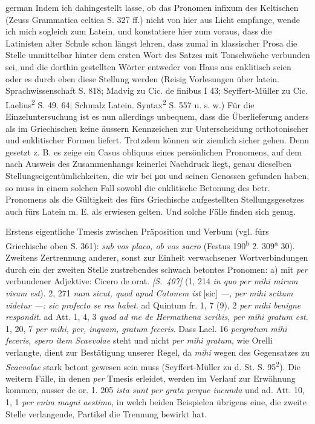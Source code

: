 \begin{otherlanguage*}{german}
Indem ich dahingestellt lasse, ob das Pronomen infixum des Keltischen (Zeuss Grammatica celtica S. 327 ff.) nicht von hier aus Licht empfange, wende ich mich sogleich zum Latein, und konstatiere hier zum voraus, dass die Latinisten alter Schule schon längst lehren, dass zumal in klassischer Prosa die Stelle unmittelbar hinter dem ersten Wort des Satzes mit Tonschwäche verbunden sei, und die dorthin gestellten Wörter entweder von Haus aus enklitisch seien oder es durch eben diese Stellung werden (Reisig Vorlesungen über latein. Sprachwissenschaft S. 818; Madvig zu Cic. de finibus I 43; Seyffert-Müller zu Cic. Laelius\textsuperscript{2} S. 49. 64; Schmalz Latein. Syntax\textsuperscript{2} S. 557 u. s. w.) Für die Einzeluntersuchung ist es nun allerdings unbequem, dass die Überlieferung anders als im Griechischen keine äussern Kennzeichen zur Unterscheidung orthotonischer und enklitischer Formen liefert. Trotzdem können wir ziemlich sicher gehen. Denn gesetzt z. B. es zeige ein Casus obliquus eines persönlichen Pronomens, auf dem nach Ausweis des Zusammenhangs keinerlei Nachdruck liegt, genau dieselben Stellungseigentümlichkeiten, die wir bei μοι und seinen Genossen gefunden haben, so muss in einem solchen Fall sowohl die enklitische Betonung des betr. Pronomens als die Gültigkeit des fürs Griechische aufgestellten Stellungsgesetzes auch fürs Latein m. E. als erwiesen gelten. Und solche Fälle finden sich genug.

Erstens eigentliche Tmesis zwischen Präposition und Verbum (vgl. fürs Griechische oben S. 361): \emph{sub vos placo, ob vos sacro} (Festus 190\textsuperscript{b} 2. 309\textsuperscript{a} 30). Zweitens Zertrennung anderer, sonst zur Einheit verwachsener Wortverbindungen durch ein der zweiten Stelle zustrebendes schwach betontes Pronomen: a) mit \emph{per} verbundener Adjektive: Cicero de orat. \hypertarget{p407}{\emph{[S.~407]}}\label{p407} (1, 214 \emph{in quo per mihi mirum visum est}). 2, 271 \emph{nam sicut, quod apud Catonem ist} [sic] \emph{—, per mihi scitum videtur —: sic profecto se res habet}. ad Quintum fr. 1, 7 (9), 2 \emph{per mihi benigne respondit}. ad Att. 1, 4, 3 \emph{quod ad me de Hermathena scribis, per mihi gratum est}. 1, 20, 7 \emph{per mihi, per, inquam, gratum feceris}. Dass Lael. 16 \emph{pergratum mihi feceris, spero item Scaevolae} steht und nicht \emph{per mihi gratum}, wie Orelli verlangte, dient zur Bestätigung unserer Regel, da \emph{mihi} wegen des Gegensatzes zu \emph{Scaevolae} stark betont gewesen sein muss (Seyffert-Müller zu d. St. S. 95\textsuperscript{2}). Die weitern Fälle, in denen \emph{per} Tmesis erleidet, werden im Verlauf zur Erwähnung kommen, ausser de or. 1. 205 \emph{ista sunt per grata perque iucunda} und ad. Att. 10, 1, 1 \emph{per enim magni aestimo}, in welch beiden Beispielen übrigens eine, die zweite Stelle verlangende, Partikel die Trennung bewirkt hat.


\end{otherlanguage*}
